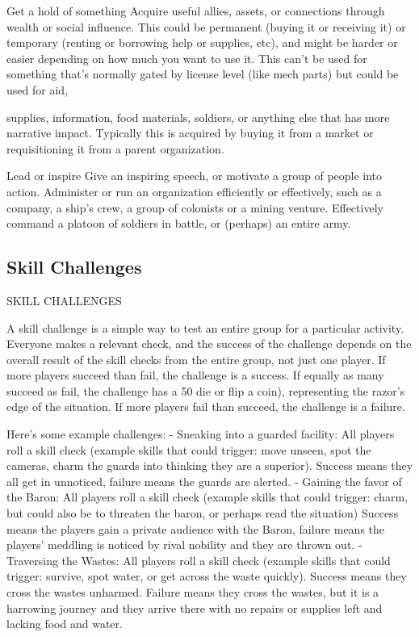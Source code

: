 Get a hold of something   
Acquire useful allies, assets, or connections through wealth or social influence. This could be  
permanent (buying it or receiving it) or temporary (renting or borrowing help or supplies, etc), and  
might be harder or easier depending on how much you want to use it. This can’t be used for  
something that’s normally gated by license level (like mech parts) but could be used for aid,  

                                                                                                                    


supplies, information, food materials, soldiers, or anything else that has more narrative impact.  
Typically this is acquired by buying it from a market or requisitioning it from a parent organization.  

Lead or inspire  
Give an inspiring speech, or motivate a group of people into action. Administer or run an  
organization efficiently or effectively, such as a company, a ship’s crew, a group of colonists or a  
mining venture. Effectively command a platoon of soldiers in battle, or (perhaps) an entire army.  

\subsection{Skill Challenges}
                                         SKILL CHALLENGES  

A skill challenge is a simple way to test an entire group for a particular activity. Everyone makes a  
relevant check, and the success of the challenge depends on the overall result of the skill checks  
from the entire group, not just one player. If more players succeed than fail, the challenge is a  
success. If equally as many succeed as fail, the challenge has a 50%
die or flip a coin), representing the razor’s edge of the situation. If more players fail than succeed,  
the challenge is a failure.  

Here’s some example challenges:  
    -    Sneaking into a guarded facility: All players roll a skill check (example skills that could  
         trigger: move unseen, spot the cameras, charm the guards into thinking they are a  
         superior). Success means they all get in unnoticed, failure means the guards are alerted.  
    -    Gaining the favor of the Baron: All players roll a skill check (example skills that could  
         trigger: charm, but could also be to threaten the baron, or perhaps read the situation)  
         Success means the players gain a private audience with the Baron, failure means the  
         players’ meddling is noticed by rival nobility and they are thrown out.  
    -    Traversing the Wastes: All players roll a skill check (example skills that could trigger:  
         survive, spot water, or get across the waste quickly). Success means they cross the  
         wastes unharmed. Failure means they cross the wastes, but it is a harrowing journey and  
         they arrive there with no repairs or supplies left and lacking food and water.  

